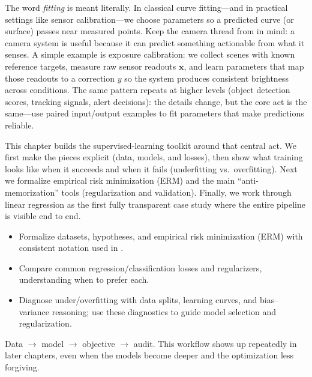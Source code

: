 The word \emph{fitting} is meant literally. In classical curve fitting---and in practical settings like sensor calibration---we choose parameters so a predicted curve (or surface) passes near measured points. Keep the camera thread from  in mind: a camera system is useful because it can predict something actionable from what it senses. A simple example is exposure calibration: we collect scenes with known reference targets, measure raw sensor readouts \(\mathbf{x}\), and learn parameters that map those readouts to a correction \(y\) so the system produces consistent brightness across conditions. The same pattern repeats at higher levels (object detection scores, tracking signals, alert decisions): the details change, but the core act is the same---use paired input/output examples to fit parameters that make predictions reliable.

This chapter builds the supervised-learning toolkit around that central act. We first make the pieces explicit (data, models, and losses), then show what training looks like when it succeeds and when it fails (underfitting vs.\ overfitting). Next we formalize empirical risk minimization (ERM) and the main ``anti-memorization'' tools (regularization and validation). Finally, we work through linear regression as the first fully transparent case study where the entire pipeline is visible end to end.

\begin{tcolorbox}[summarybox, title={Learning Outcomes}]
\begin{itemize}
    \item Formalize datasets, hypotheses, and empirical risk minimization (ERM) with consistent notation used in .
    \item Compare common regression/classification losses and regularizers, understanding when to prefer each.
    \item Diagnose under/overfitting with data splits, learning curves, and bias--variance reasoning; use these diagnostics to guide model selection and regularization.
\end{itemize}
\end{tcolorbox}

\begin{tcolorbox}[summarybox, title={Design motif}]
Data \(\rightarrow\) model \(\rightarrow\) objective \(\rightarrow\) audit. This workflow shows up repeatedly in later chapters, even when the models become deeper and the optimization less forgiving.
\end{tcolorbox}

